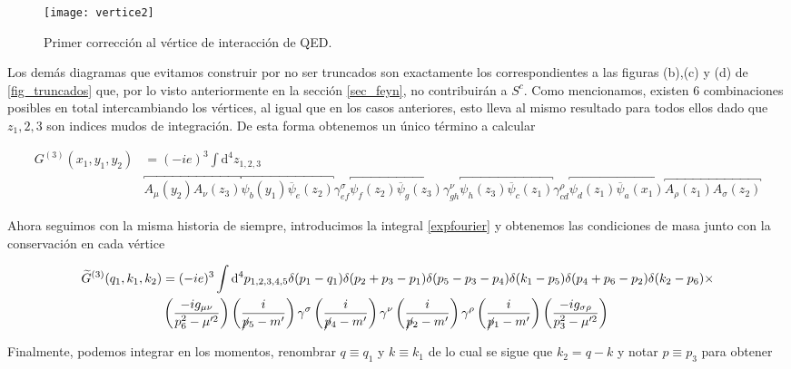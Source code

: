\documentclass[tickz]{article}
\numberwithin{equation}{section}
\begin{document}
\begin{figure}[h]
	\centering
	\texttt{[image: vertice2]}
	\caption{Primer corrección al vértice de interacción de QED.}
	\label{fig_vertex2}
\end{figure}

Los demás diagramas que evitamos construir por no ser truncados son exactamente los correspondientes a las figuras (b),(c) y (d) de \ref{fig_truncados} que, por lo visto anteriormente en la sección \ref{sec_feyn}, no contribuirán a $ S^c $.
Como mencionamos, existen 6 combinaciones posibles en total intercambiando los vértices, al igual que en los casos anteriores, esto lleva al mismo resultado para todos ellos dado que $ z_1,2,3 $ son indices mudos de integración. De esta forma obtenemos un único término a calcular 

\begin{equation}\label{key}
\begin{aligned}
G^{(3)}(x_1,y_1,y_2)&=(-ie)^3\int \mathrm{d^4}z_{1,2,3}\\
& \overbracket{A_{\mu}(y_2)A_{\nu}(z_3)} \overbracket{\psi_b(y_1) \overline{\psi}_e(z_2)} \gamma^{\sigma}_{ef} \overbracket{\psi_f(z_2) \overline{\psi}_g(z_3)} \gamma^{\nu}_{gh} \overbracket{\psi_h(z_3) \overline{\psi}_c(z_1)} \gamma^{\rho}_{cd} \overbracket{\psi_d(z_1) \overline{\psi}_a(x_1)} \overbracket{ A_{\rho}(z_1)A_{\sigma}(z_2)}
\end{aligned}
\end{equation} 

Ahora seguimos con la misma historia de siempre, introducimos la integral \ref{expfourier} y obtenemos las condiciones de masa junto con la conservación en cada vértice

\begin{equation}\label{key}
\begin{aligned}
\widetilde{G}^{(3)}(q_1,k_1,k_2)&=(-ie)^3\int \mathrm{d^4}p_{1,2,3,4,5} \delta(p_1-q_1)\delta(p_2+p_3-p_1)\delta(p_5-p_3-p_4)\delta(k_1-p_5)\delta(p_4+p_6-p_2)\delta(k_2-p_6) \times\\
&\left(\frac{-ig_{\mu\nu}}{p_6^2-\mu'^2}\right)\left(\frac{i}{\cancel{p}_5-m'}\right)\gamma^{\sigma}\left(\frac{i}{\cancel{p}_4-m'}\right)\gamma^{\nu}\left(\frac{i}{\cancel{p}_2-m'}\right)\gamma^{\rho}\left(\frac{i}{\cancel{p}_1-m'}\right)\left(\frac{-ig_{\sigma\rho}}{p_3^2-\mu'^2}\right)
\end{aligned}
\end{equation}
 
Finalmente, podemos integrar en los momentos, renombrar $ q\equiv q_1 $ y $ k \equiv k_1 $ de lo cual se sigue que $ k_2 =q-k $
y notar $ p\equiv p_3 $ para obtener
\end{document}
